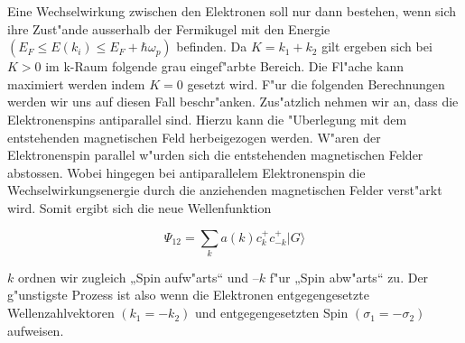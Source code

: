\begin{refsection}
  
Eine Wechselwirkung zwischen den Elektronen soll nur dann bestehen, wenn sich ihre Zust"ande ausserhalb der Fermikugel mit den Energie $(E_F \le E(k_i) \le E_F+\hbar\omega_p)$ befinden. Da $K=k_1+k_2$ gilt ergeben sich bei $K>0$ im k-Raum folgende grau eingef"arbte Bereich. Die Fl"ache kann maximiert werden indem $K=0$ gesetzt wird. F"ur die folgenden Berechnungen werden wir uns auf diesen Fall beschr"anken.
Zus"atzlich nehmen wir an, dass die Elektronenspins antiparallel sind. Hierzu kann die "Uberlegung mit dem entstehenden magnetischen Feld herbeigezogen werden. W"aren der Elektronenspin parallel w"urden sich die entstehenden magnetischen Felder abstossen. Wobei hingegen bei antiparallelem Elektronenspin die Wechselwirkungsenergie durch die anziehenden magnetischen Felder verst"arkt wird.
Somit ergibt sich die neue Wellenfunktion

\[
\Psi_{12}=\sum \limits_{k} a(k)c^+_{k}c^+_{-k}|G\rangle
\]

$k$ ordnen wir zugleich „Spin aufw"arts“ und $–k$ f"ur „Spin abw"arts“ zu.
Der g"unstigste Prozess ist also wenn die Elektronen entgegengesetzte Wellenzahlvektoren $(k_1 = -k_2)$ und entgegengesetzten Spin $(\sigma_1 = -\sigma_2)$ aufweisen.
\\
\\
\printbibliography[heading=subbibliography]
\end{refsection}

